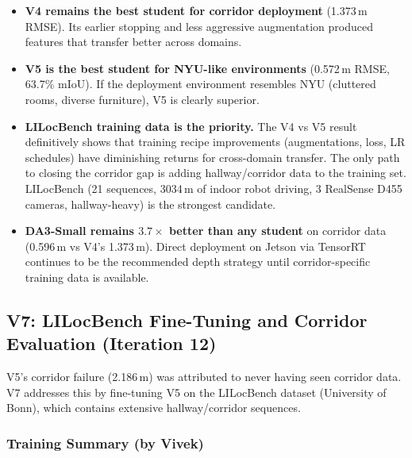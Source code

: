 \documentclass[11pt,a4paper]{article}
\begin{document}
\begin{itemize}[nosep]
  \item \textbf{V4 remains the best student for corridor deployment}
    (1.373\,m RMSE). Its earlier stopping and less aggressive augmentation
    produced features that transfer better across domains.
  \item \textbf{V5 is the best student for NYU-like environments}
    (0.572\,m RMSE, 63.7\% mIoU). If the deployment environment resembles
    NYU (cluttered rooms, diverse furniture), V5 is clearly superior.
  \item \textbf{LILocBench training data is the priority.}
    The V4 vs V5 result definitively shows that training recipe improvements
    (augmentations, loss, LR schedules) have diminishing returns for
    cross-domain transfer. The only path to closing the corridor gap is
    adding hallway/corridor data to the training set. LILocBench
    (21 sequences, 3034\,m of indoor robot driving, 3 RealSense D455
    cameras, hallway-heavy) is the strongest candidate.
  \item \textbf{DA3-Small remains $3.7\times$ better than any student}
    on corridor data (0.596\,m vs V4's 1.373\,m). Direct deployment
    on Jetson via TensorRT continues to be the recommended depth strategy
    until corridor-specific training data is available.
\end{itemize}

\subsection{V7: LILocBench Fine-Tuning and Corridor Evaluation (Iteration 12)}
\label{sec:vivek-v7}

V5's corridor failure (2.186\,m) was attributed to never having seen corridor
data. V7 addresses this by fine-tuning V5 on the LILocBench dataset
(University of Bonn), which contains extensive hallway/corridor sequences.

\subsubsection{Training Summary (by Vivek)}
\end{document}
